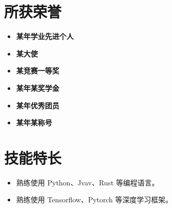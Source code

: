 \documentclass[11pt]{article}
\newlength{\iconwidth}
\begin{document}
    \vspace{1em}

    \begin{minipage}[t]{\textwidth}
        \section[所获荣誉]{\makebox[\iconwidth][c]{\color{primary_color}{\faStar}}\quad 所获荣誉}
        \vspace{0.5em}
        
        \begin{minipage}[t]{0.48\linewidth}
            \begin{itemize}
                \setlength{\itemsep}{0.2em} %
                \setlength{\leftmargin}{1.2em} %
                \item \textbf{某年学业先进个人}
                \item \textbf{某大使} 
                \item \textbf{某竞赛一等奖}
            \end{itemize}
        \end{minipage}%
        \hfill %
        \begin{minipage}[t]{0.48\linewidth}
            \begin{itemize}
                \setlength{\itemsep}{0.2em}
                \setlength{\leftmargin}{1.2em}
                \item \textbf{某年某奖学金}
                \item \textbf{某年优秀团员}
                \item \textbf{某年某称号}
            \end{itemize}
        \end{minipage}
    \end{minipage}

    \vspace{1em}
    
    \begin{minipage}[t]{\textwidth}
        \section[技能特长]{\makebox[\iconwidth][c]{\color{primary_color}{\faWrench}}\quad 技能特长}
        \begin{itemize}
        \setlength{\itemsep}{0.5em}
            \item 熟练使用 Python、Jvav、Rust 等编程语言。
            \item 熟练使用 Tensorflow、Pytorch 等深度学习框架。
        \end{itemize}
    \end{minipage}
    
\end{document}

